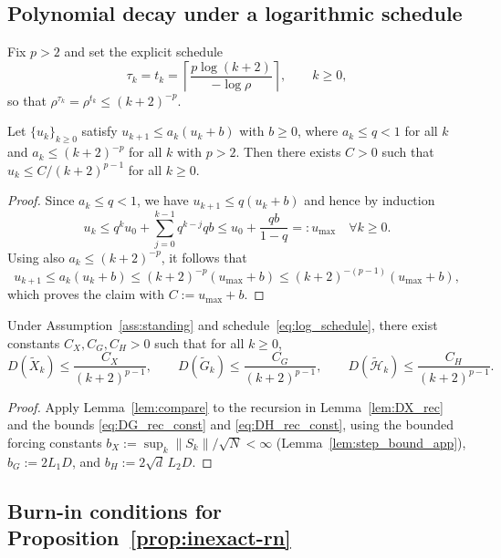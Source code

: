\documentclass[review,onefignum,onetabnum]{siamart171218}
\begin{document}
\subsection{Polynomial decay under a logarithmic schedule}

Fix $p>2$ and set the explicit schedule
\begin{equation}\label{eq:log_schedule}
\tau_k=t_k=\left\lceil \frac{p\log(k+2)}{-\log\rho}\right\rceil,\qquad k\ge 0,
\end{equation}
so that $\rho^{\tau_k}=\rho^{t_k}\le (k+2)^{-p}$.

\begin{lemma}\label{lem:compare}
Let $\{u_k\}_{k\ge0}$ satisfy $u_{k+1}\le a_k(u_k+b)$ with $b\ge0$, where
$a_k\le q<1$ for all $k$ and $a_k\le (k+2)^{-p}$ for all $k$ with $p>2$.
Then there exists $C>0$ such that $u_k\le C/(k+2)^{p-1}$ for all $k\ge0$.
\end{lemma}
\begin{proof}
Since $a_k\le q<1$, we have $u_{k+1}\le q(u_k+b)$ and hence by induction
\[
u_k\le q^k u_0+\sum_{j=0}^{k-1} q^{k-j}qb \le u_0+\frac{qb}{1-q}=:u_{\max}\quad \forall k\ge 0.
\]
Using also $a_k\le (k+2)^{-p}$, it follows that
\[
u_{k+1}\le a_k(u_k+b)\le (k+2)^{-p}(u_{\max}+b)\le (k+2)^{-(p-1)}(u_{\max}+b),
\]
which proves the claim with $C:=u_{\max}+b$.
\end{proof}

\begin{proposition}\label{prop:dispersion_decay}
Under Assumption~\ref{ass:standing} and schedule~\eqref{eq:log_schedule},
there exist constants $C_X,C_G,C_H>0$ such that for all $k\ge0$,
\[
D(\tilde X_k)\le \frac{C_X}{(k+2)^{p-1}},
\qquad
D(\tilde G_k)\le \frac{C_G}{(k+2)^{p-1}},
\qquad
D(\tilde{\mathcal H}_k)\le \frac{C_H}{(k+2)^{p-1}}.
\]
\end{proposition}
\begin{proof}
Apply Lemma~\ref{lem:compare} to the recursion in Lemma~\ref{lem:DX_rec} and the bounds \eqref{eq:DG_rec_const} and \eqref{eq:DH_rec_const},
using the bounded forcing constants $b_X:=\sup_k\|S_k\|/\sqrt N<\infty$ (Lemma~\ref{lem:step_bound_app}),
$b_G:=2L_1D$, and $b_H:=2\sqrt d\,L_2D$.
\end{proof}

\subsection{Burn-in conditions for Proposition~\ref{prop:inexact-rn}}
\end{document}
